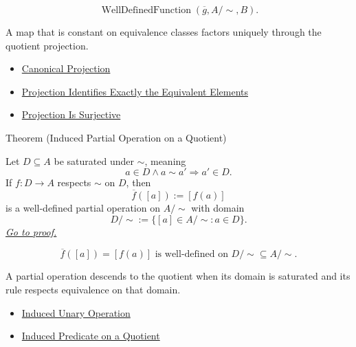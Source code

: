 \begin{remark*}
\[
\operatorname{WellDefinedFunction}(\overline{g},A/{\sim},B).
\]
\end{remark*}

\begin{remark*}[Interpretation]
A map that is constant on equivalence classes factors uniquely through the
quotient projection.
\end{remark*}

\begin{dependencies}
\begin{itemize}
  \item \hyperref[def:canonical-projection]{Canonical Projection}
  \item \hyperref[prop:projection-identifies-equivalent-elements]{Projection Identifies Exactly the Equivalent Elements}
  \item \hyperref[prop:projection-is-surjective]{Projection Is Surjective}
\end{itemize}
\end{dependencies}

\begin{theorembox}{Theorem (Induced Partial Operation on a Quotient)}
\begin{theorem}
\label{thm:induced-partial-operation-on-quotient}
Let $D\subseteq A$ be saturated under $\sim$, meaning
\[
a\in D\land a\sim a'\Longrightarrow a'\in D.
\]
If $f:D\to A$ respects $\sim$ on $D$, then
\[
\overline{f}([a]):=[f(a)]
\]
is a well-defined partial operation on $A/{\sim}$ with domain
\[
D/{\sim}:=\{[a]\in A/{\sim}:a\in D\}.
\]
\hyperref[prf:induced-partial-operation-on-quotient]{\textit{Go to proof.}}
\end{theorem}
\end{theorembox}

\begin{remark*}
\[
\overline{f}([a])=[f(a)]
\text{ is well-defined on } D/{\sim}\subseteq A/{\sim}.
\]
\end{remark*}

\begin{remark*}[Interpretation]
A partial operation descends to the quotient when its domain is saturated and
its rule respects equivalence on that domain.
\end{remark*}

\begin{dependencies}
\begin{itemize}
  \item \hyperref[thm:induced-unary-operation-on-quotient]{Induced Unary Operation}
  \item \hyperref[thm:induced-predicate-on-quotient]{Induced Predicate on a Quotient}
\end{itemize}
\end{dependencies}

